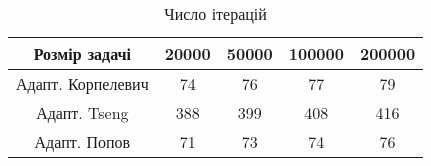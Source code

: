 \begin{table}[H]
	\centering
	\begin{tabular}{|c||c|c|c|c|}\hline
		Розмір задачі & 20000 & 50000 & 100000 & 200000 \\ \hline \hline
		Адапт. Корпелевич & 74 & 76 & 77 & 79 \\ \hline
		Адапт. Tseng & 388 & 399 & 408 & 416 \\ \hline
		Адапт. Попов & 71 & 73 & 74 & 76 \\ \hline
	\end{tabular}
	\caption{Число ітерацій}
\end{table}
